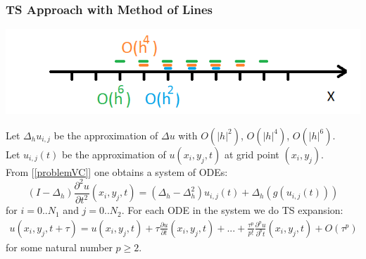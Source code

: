 \documentclass{beamer}
\newcommand{\be}{\begin{equation}}
\newcommand{\ee}{\end{equation}}
\newcommand{\RR}{\mathbb{R}}
\begin{document}
\begin{frame}
\frametitle{TS Approach with Method of Lines}
\begin{center}\vspace{0.25cm}
	\begin{minipage}[b]{0.45\linewidth}
		 \includegraphics[width=\linewidth]{figures/FDS.png}
	\end{minipage}	
\end{center}
Let $\Delta_h u_{i,j}$ be the approximation of $\Delta u$ with $O(|h|^2)$, $O(|h|^4)$, $O(|h|^6)$.
\\
Let $u_{i,j}(t)$ be the approximation of $u(x_i, y_j, t)$ at grid point $(x_i, y_j)$.
\\
From [\ref{problemVC}] one obtains a system of ODEs:
\be \label{DiscreteEq}
 (I-\Delta_h) \frac{\partial^2 u}{\partial t^2}(x_i, y_j, t)=
 (\Delta_h - \Delta_h^2) u_{i, j}(t) + \Delta_h ( g( u_{i, j}(t) ) )
\ee
for $i = 0..N_1$ and $j=0..N_2$. For each ODE in the system we do TS expansion:
\begin{align} \label{TSe}
u(x_i, y_j, t+\tau) = u(x_i, y_j, t) + \tau \frac{ \partial u }{ \partial t }(x_i, y_j, t)  + ... 
+ \frac{ \tau^p }{ p! } \frac{ \partial^p u }{ \partial^p t }(x_i, y_j, t) + O(\tau^p)
\end{align}
for some natural number $p \ge 2$.


\end{frame}
\end{document}
